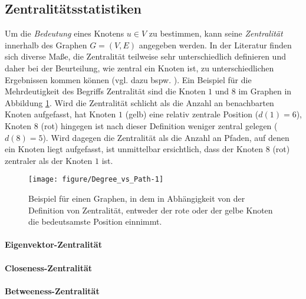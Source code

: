 \documentclass[12pt, a4paper]{report}\usepackage[]{graphicx}\usepackage[]{color}
\newenvironment{knitrout}{}{} %
\begin{document}
\subsection{Zentralitätsstatistiken}\label{Kap_Zentralitätsstatistiken}
Um die \textit{Bedeutung} eines Knotens $u \in V$ zu bestimmen, kann seine \textit{Zentralität} innerhalb des Graphen $G=(V,E)$ angegeben werden. In der Literatur finden sich diverse Maße, die Zentralität teilweise sehr unterschiedlich definieren und daher bei der Beurteilung, wie zentral ein Knoten ist, zu unterschiedlichen Ergebnissen kommen können (vgl. dazu bspw. ). Ein Beispiel für die Mehrdeutigkeit des Begriffs Zentralität sind die Knoten $1$ und $8$ im Graphen in Abbildung \ref{fig:Degree_vs_Path}. Wird die Zentralität schlicht als die Anzahl an benachbarten Knoten aufgefasst, hat Knoten $1$ (gelb) eine relativ zentrale Position ($d(1)=6$), Knoten $8$ (rot) hingegen ist nach dieser Definition weniger zentral gelegen ($d(8)=5$). Wird dagegen die Zentralität als die Anzahl an Pfaden, auf denen ein Knoten liegt aufgefasst, ist unmittelbar ersichtlich, dass der Knoten $8$ (rot) zentraler als der Knoten $1$ ist.\\



\begin{knitrout}
\color{fgcolor}\begin{figure}[H]


{\centering \texttt{[image: figure/Degree\_vs\_Path-1]} 

}

\caption[Beispielgraph]{Beispiel für einen Graphen, in dem in Abhängigkeit von der Definition von Zentralität, entweder der rote oder der gelbe Knoten die bedeutsamste Position einnimmt.\label{fig:Degree_vs_Path}}
\end{figure}


\end{knitrout}

\paragraph*{Eigenvektor-Zentralität}\label{Kap_Eigenvektor-Zentralität}
\paragraph*{Closeness-Zentralität}\label{Kap_Closeness-Zentralität}
\paragraph*{Betweeness-Zentralität}\label{Kap_Betweeness-Zentralität}
\end{document}
